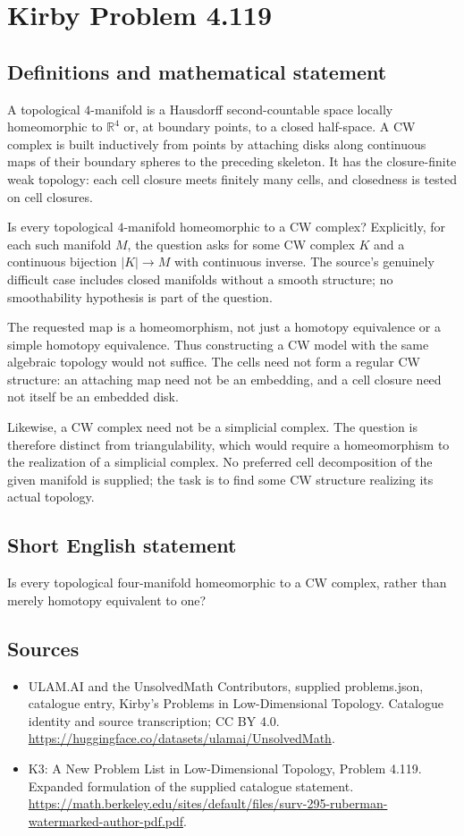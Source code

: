 \documentclass[11pt,a4paper]{article}
\begin{document}
\section*{Kirby Problem 4.119}\label{statement}

\subsection{Definitions and mathematical statement}
A topological $4$-manifold is a Hausdorff second-countable space
locally homeomorphic to $\mathbb R^4$ or, at boundary points,
to a closed half-space. A CW complex is built inductively from
points by attaching disks along continuous maps of their boundary
spheres to the preceding skeleton. It has the closure-finite weak
topology: each cell closure meets finitely many cells, and closedness
is tested on cell closures.

Is every topological $4$-manifold homeomorphic to a CW complex?
Explicitly, for each such manifold $M$, the question asks for some
CW complex $K$ and a continuous bijection $|K|\to M$ with
continuous inverse. The source's genuinely difficult case includes
closed manifolds without a smooth structure; no smoothability
hypothesis is part of the question.

The requested map is a homeomorphism, not just a homotopy
 equivalence or a simple homotopy equivalence. Thus constructing
a CW model with the same algebraic topology would not suffice.
The cells need not form a regular CW structure: an attaching
map need not be an embedding, and a cell closure need not itself
be an embedded disk.

Likewise, a CW complex need not be a simplicial complex. The
question is therefore distinct from triangulability, which would
require a homeomorphism to the realization of a simplicial complex.
No preferred cell decomposition of the given manifold is supplied;
the task is to find some CW structure realizing its actual topology.
\subsection{Short English statement}
Is every topological four-manifold homeomorphic to a CW complex, rather than merely homotopy equivalent to one?
\subsection{Sources}
\begin{itemize}
\item[S1] ULAM.AI and the UnsolvedMath Contributors, supplied problems.json, catalogue entry, Kirby's Problems in Low-Dimensional Topology. Catalogue identity and source transcription; CC BY 4.0.
\url{https://huggingface.co/datasets/ulamai/UnsolvedMath}.
\item[S2] K3: A New Problem List in Low-Dimensional Topology, Problem 4.119. Expanded formulation of the supplied catalogue statement.
\url{https://math.berkeley.edu/sites/default/files/surv-295-ruberman-watermarked-author-pdf.pdf}.
\end{itemize}
\end{document}
